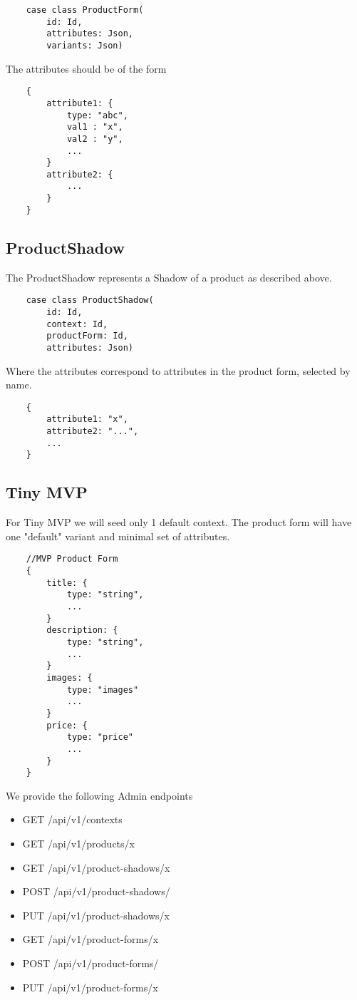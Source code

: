 \documentclass[11pt]{article}
\begin{document}
\begin{lstlisting}
    case class ProductForm(
        id: Id,
        attributes: Json,
        variants: Json)
\end{lstlisting}

The attributes should be of the form
\begin{lstlisting}
    {
        attribute1: {
            type: "abc",
            val1 : "x",
            val2 : "y",
            ...
        }
        attribute2: {
            ...
        }
    }
\end{lstlisting}


\subsection{ProductShadow}

The ProductShadow represents a Shadow of a product as described above. 

\begin{lstlisting}
    case class ProductShadow(
        id: Id,
        context: Id,
        productForm: Id,
        attributes: Json)
\end{lstlisting}

Where the attributes correspond to attributes in the product form, selected by
name.

\begin{lstlisting}
    {
        attribute1: "x",
        attribute2: "...",
        ...
    }
\end{lstlisting}

\newpage
\subsection{Tiny MVP}

For Tiny MVP we will seed only 1 default context. The product form will have one
"default" variant and minimal set of attributes.

\begin{lstlisting}
    //MVP Product Form
    {
        title: { 
            type: "string",
            ...
        }
        description: { 
            type: "string",
            ...  
        }
        images: { 
            type: "images"
            ...  
        }
        price: {
            type: "price"
            ...
        }
    }
\end{lstlisting}
\newpage

We provide the following Admin endpoints

\begin{itemize}
    \item GET /api/v1/contexts
    \item GET /api/v1/products/x
    \item GET /api/v1/product-shadows/x
    \item POST /api/v1/product-shadows/
    \item PUT /api/v1/product-shadows/x
    \item GET /api/v1/product-forms/x
    \item POST /api/v1/product-forms/
    \item PUT /api/v1/product-forms/x
\end{itemize}
\end{document}
